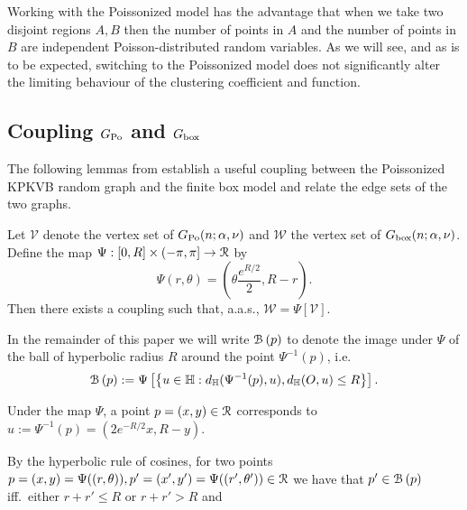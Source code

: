 Working with the Poissonized model has the advantage that when we take two disjoint regions $A, B$ then the number of points in $A$ and the number of points  in $B$ are independent Poisson-distributed random variables. As we will see, and as is to be expected, switching to the Poissonized model does not significantly alter the limiting behaviour of the clustering coefficient and function.


\subsection{Coupling $G_{\text{Po}}$ and $G_{\text{box}}$\label{ssec:coupling_H_P}}


The following lemmas from \cite{fountoulakis2018law} establish a useful coupling between the Poissonized KPKVB random graph
and the finite box model and relate the edge  sets of the two graphs. 

\begin{lemma}\label{lem:coupling_hyperbolic_poisson}
Let $\mathcal{V}$ denote the vertex set of $G_{\text{Po}}(n;\alpha, \nu)$ and $\mathcal{W}$ the vertex set of $G_{\text{box}}(n;\alpha, \nu)$. 
Define the map $\Psi : [0,R] \times (-\pi, \pi] \to {\mathcal R}$ by
\begin{equation}\label{eq:def_Psi}
	\Psi(r,\theta) = \left(\theta \frac{e^{R/2}}{2}, R - r\right).
\end{equation}
Then there exists a coupling such that, a.a.s., $\mathcal{W} = \Psi[\mathcal{V}]$. %
\end{lemma}

In the remainder of this paper we will write ${\mathcal B}\left(p\right)$ to denote the image under $\Psi$ of the ball of hyperbolic radius $R$ around the point 
$\Psi^{-1}(p)$, i.e. 
\[
	{\mathcal B}\left(p\right) := 
	\Psi\left[ \left\{ u \in {\mathbb H} : 
	d_{\mathbb{H}}(\Psi^{-1}(p),u), d_{\mathbb{H}}(O,u) \le R \right\}\right].
\]

Under the map $\Psi$, a point $p = (x,y) \in {\mathcal R}$ corresponds to $u := \Psi^{-1}(p) = (2 e^{-R/2} x, R - y)$. 

By the hyperbolic rule of cosines, for two points $p = (x,y) = \Psi( (r,\theta) ), p' = (x',y') = \Psi( (r',\theta') ) \in {\mathcal R}$ we have that
$p' \in {\mathcal B}\left(p\right)$ iff.~either $r+r'\leq R$ or $r+r'>R$ and


